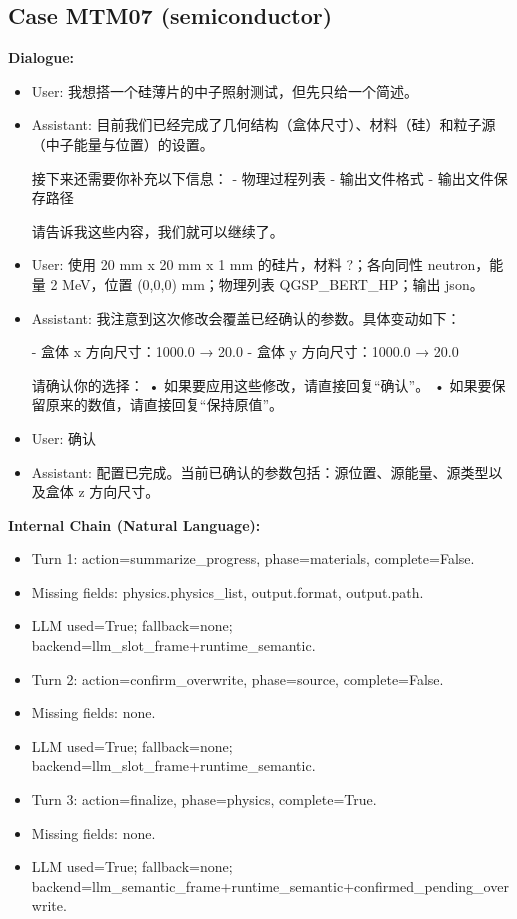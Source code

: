 \documentclass[11pt]{ctexart}
\begin{document}
\subsection{Case MTM07 (semiconductor)}
\textbf{Dialogue:}
\begin{itemize}
\item User: 我想搭一个硅薄片的中子照射测试，但先只给一个简述。
\item Assistant: 目前我们已经完成了几何结构（盒体尺寸）、材料（硅）和粒子源（中子能量与位置）的设置。

接下来还需要你补充以下信息：
- 物理过程列表
- 输出文件格式
- 输出文件保存路径

请告诉我这些内容，我们就可以继续了。
\item User: 使用 20 mm x 20 mm x 1 mm 的硅片，材料 ?；各向同性 neutron，能量 2 MeV，位置 (0,0,0) mm；物理列表 QGSP\_BERT\_HP；输出 json。
\item Assistant: 我注意到这次修改会覆盖已经确认的参数。具体变动如下：

- 盒体 x 方向尺寸：1000.0 → 20.0
- 盒体 y 方向尺寸：1000.0 → 20.0

请确认你的选择：
• 如果要应用这些修改，请直接回复“确认”。
• 如果要保留原来的数值，请直接回复“保持原值”。
\item User: 确认
\item Assistant: 配置已完成。当前已确认的参数包括：源位置、源能量、源类型以及盒体 z 方向尺寸。
\end{itemize}
\textbf{Internal Chain (Natural Language):}
\begin{itemize}
\item Turn 1: action=summarize\_progress, phase=materials, complete=False.
\item Missing fields: physics.physics\_list, output.format, output.path.
\item LLM used=True; fallback=none; backend=llm\_slot\_frame+runtime\_semantic.
\item Turn 2: action=confirm\_overwrite, phase=source, complete=False.
\item Missing fields: none.
\item LLM used=True; fallback=none; backend=llm\_slot\_frame+runtime\_semantic.
\item Turn 3: action=finalize, phase=physics, complete=True.
\item Missing fields: none.
\item LLM used=True; fallback=none; backend=llm\_semantic\_frame+runtime\_semantic+confirmed\_pending\_overwrite.
\end{itemize}
\end{document}
